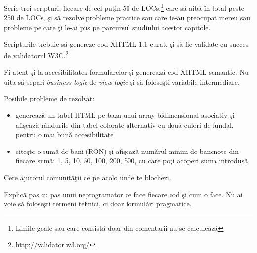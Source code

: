 \begin{Exercise}[title={Scrie scripturi}]

\ExePart

Scrie trei scripturi, fiecare de cel puţin 50 de
LOCs,\footnote{Liniile goale sau care consistă doar din comentarii nu se calculează}
care să aibă în total peste 250 de LOCs, şi să rezolve probleme practice sau care
te-au preocupat mereu sau probleme pe care ţi le-ai pus pe parcursul studiului acestor
capitole.

Scripturile trebuie să genereze cod XHTML 1.1 curat, şi să fie
validate cu succes de \href{http://validator.w3.org/}{validatorul W3C}.\footnote{http://validator.w3.org/}

Fi atent şi la accesibilitatea formularelor şi generează cod XHTML semantic. Nu uita
să separi \textit{business logic} de
\textit{view logic} şi să foloseşti variabile intermediare.

Posibile probleme de rezolvat:
\begin{itemize}
  \item generează un tabel HTML pe baza unui array bidimensional asociativ şi afişează
rândurile din tabel colorate alternativ cu două culori de fundal, pentru o mai bună accesibilitate
  \item citeşte o sumă de bani (RON) şi afişează numărul minim de bancnote din
fiecare sumă: 1, 5, 10, 50, 100, 200, 500, cu care poţi acoperi suma introdusă
\end{itemize}

Cere ajutorul comunităţii de pe {\phpro} acolo unde te blochezi.

\ExePart

Explică pas cu pas unui neprogramator ce face fiecare cod şi cum o face.
Nu ai voie să foloseşti termeni tehnici, ci doar formulări pragmatice.

\end{Exercise}
